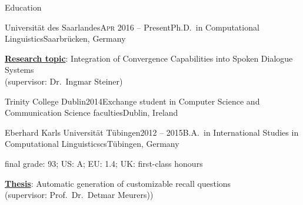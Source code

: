 \documentclass{resume} %
\begin{document}

\begin{rSection}{Education}

\begin{rSubsection}{Universität des Saarlandes}{\textsc{Apr} 2016 -- Present}{Ph.D.\ in Computational Linguistics}{Saarbrücken, Germany} %
	\setlength{\itemindent}{.7cm}
		
	\item \textbf{\underline{Research topic}}: Integration of Convergence Capabilities into Spoken Dialogue Systems \\\hspace*{.7cm}(supervisor: Dr.\ Ingmar Steiner)

	
\end{rSubsection}

\begin{rSubsection}{Trinity College Dublin}{2014}{Exchange student in Computer Science and Communication Science faculties}{Dublin, Ireland}
	\setlength{\itemindent}{.7cm}
	
	\item[]%
	
\end{rSubsection}

\begin{rSubsection}{Eberhard Karls Universität Tübingen}{2012 -- 2015}{B.A.\ in International Studies in Computational Linguisticscs}{Tübingen, Germany}
	
\vspace*{-.2cm}
\item[]{\footnotesize final grade: 93; US: A; EU: 1.4; UK: first-class honours}
\vspace*{.2cm}

	\setlength{\itemindent}{.7cm}
	
	\item \textbf{\underline{Thesis}}: Automatic generation of customizable recall questions
	\\\hspace*{.7cm}(supervisor: Prof.\ Dr.\ Detmar Meurers))
	

\end{rSubsection}
\end{rSection}
\end{document}
